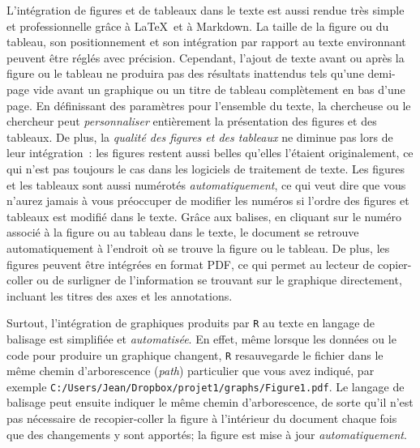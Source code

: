 \documentclass[
  letterpaper,
  DIV=11,
  numbers=noendperiod]{scrreprt}
\begin{document}
L'intégration de figures et de tableaux dans le texte est aussi rendue
très simple et professionnelle grâce à \LaTeX~et à Markdown. La taille
de la figure ou du tableau, son positionnement et son intégration par
rapport au texte environnant peuvent être réglés avec précision.
Cependant, l'ajout de texte avant ou après la figure ou le tableau ne
produira pas des résultats inattendus tels qu'une demi-page vide avant
un graphique ou un titre de tableau complètement en bas d'une page. En
définissant des paramètres pour l'ensemble du texte, la chercheuse ou le
chercheur peut \emph{personnaliser} entièrement la présentation des
figures et des tableaux. De plus, la \emph{qualité des figures et des
tableaux} ne diminue pas lors de leur intégration~: les figures restent
aussi belles qu'elles l'étaient originalement, ce qui n'est pas toujours
le cas dans les logiciels de traitement de texte. Les figures et les
tableaux sont aussi numérotés \emph{automatiquement}, ce qui veut dire
que vous n'aurez jamais à vous préoccuper de modifier les numéros si
l'ordre des figures et tableaux est modifié dans le texte. Grâce aux
balises, en cliquant sur le numéro associé à la figure ou au tableau
dans le texte, le document se retrouve automatiquement à l'endroit où se
trouve la figure ou le tableau. De plus, les figures peuvent être
intégrées en format PDF, ce qui permet au lecteur de copier-coller ou de
surligner de l'information se trouvant sur le graphique directement,
incluant les titres des axes et les annotations.

Surtout, l'intégration de graphiques produits par \texttt{R} au texte en
langage de balisage est simplifiée et \emph{automatisée}. En effet, même
lorsque les données ou le code pour produire un graphique changent,
\texttt{R} resauvegarde le fichier dans le même chemin d'arborescence
(\emph{path}) particulier que vous avez indiqué, par exemple
\texttt{C:/Users/Jean/Dropbox/projet1/graphs/Figure1.pdf}. Le langage de
balisage peut ensuite indiquer le même chemin d'arborescence, de sorte
qu'il n'est pas nécessaire de recopier-coller la figure à l'intérieur du
document chaque fois que des changements y sont apportés; la figure est
mise à jour \emph{automatiquement}.
\end{document}
